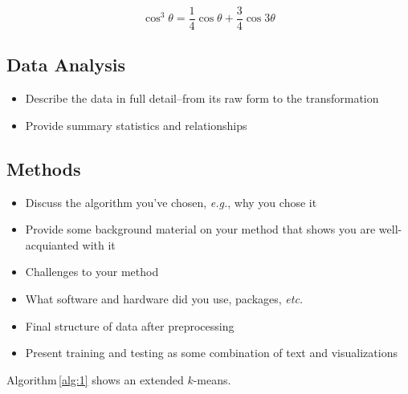 \documentclass[fleqn,10pt]{SelfArx} %
\begin{document}

\lipsum[4] %

\begin{equation}
\cos^3 \theta =\frac{1}{4}\cos\theta+\frac{3}{4}\cos 3\theta
\label{eq:refname2}
\end{equation}

\lipsum[5] %


\subsection{Data Analysis}
\begin{itemize}[noitemsep]
\item Describe the data in full detail--from its raw form to the transformation
\item Provide summary statistics and relationships
\end{itemize}

\lipsum[6] %

\subsection{Methods}
\begin{itemize}[noitemsep]
\item Discuss the algorithm you've chosen, \textit{e.g.}, why you chose it
\item Provide some background material on your method that shows you are well-acquianted with it
\item Challenges to your method
\item What software and hardware did you use, packages, \textit{etc.}
\item Final structure of data after preprocessing
\item Present training and testing as some combination of text and visualizations
\end{itemize}
Algorithm\,\ref{alg:1} shows an extended $k$-means.
\end{document}
